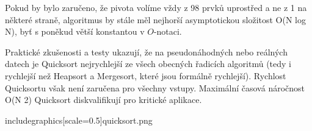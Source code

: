 \documentclass{article}
\begin{document}
Pokud by bylo zaručeno, že pivota volíme vždy z 98   prvků uprostřed a ne z 1   na některé straně, algoritmus by stále měl nejhorší asymptotickou složitost O(N log N), byť s poněkud větší konstantou v $O$-notaci.

Praktické zkušenosti a testy ukazují, že na pseudonáhodných nebo reálných datech je Quicksort nejrychlejší ze všech obecných řadicích algoritmů (tedy i rychlejší než Heapsort a Mergesort, které jsou formálně rychlejší). Rychlost Quicksortu však není zaručena pro všechny vstupy. Maximální časová náročnost O(N 2) Quicksort diskvalifikují pro kritické aplikace.

includegraphics[scale=0.5]{quicksort.png}
\end{document}
